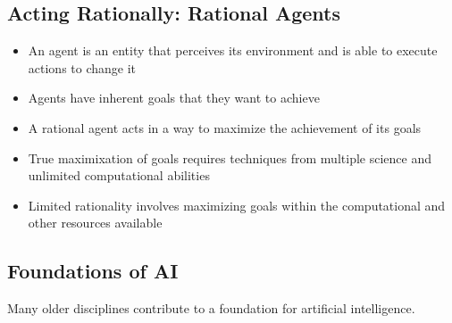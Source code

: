 \documentclass[12pt]{article}
\begin{document}
\subsection*{Acting Rationally: Rational Agents}

\begin{itemize}
    \item An agent is an entity that perceives its environment and is able to execute actions to change it
    \item Agents have inherent goals that they want to achieve
    \item A rational agent acts in a way to maximize the achievement of its goals
    \item True maximixation of goals requires techniques from multiple science and unlimited computational abilities
    \item Limited rationality involves maximizing goals within the computational and other resources available
\end{itemize}


\subsection*{Foundations of AI}

Many older disciplines contribute to a foundation for artificial intelligence.
\end{document}
